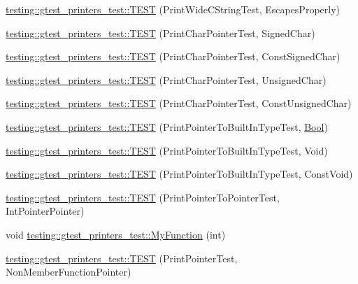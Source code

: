 \begin{DoxyCompactItemize}
\item 
\hyperlink{namespacetesting_1_1gtest__printers__test_aa80d6bb47e6bf997dacf0c75322d12cf}{testing\+::gtest\+\_\+printers\+\_\+test\+::\+T\+E\+ST} (Print\+Wide\+C\+String\+Test, Escapes\+Properly)
\item 
\hyperlink{namespacetesting_1_1gtest__printers__test_acd7a56709621a91dca669023d192bdc7}{testing\+::gtest\+\_\+printers\+\_\+test\+::\+T\+E\+ST} (Print\+Char\+Pointer\+Test, Signed\+Char)
\item 
\hyperlink{namespacetesting_1_1gtest__printers__test_ae854b0ca4d06ffc273c391f262884681}{testing\+::gtest\+\_\+printers\+\_\+test\+::\+T\+E\+ST} (Print\+Char\+Pointer\+Test, Const\+Signed\+Char)
\item 
\hyperlink{namespacetesting_1_1gtest__printers__test_afb9a6a26323b287b7666b6adb5bdb149}{testing\+::gtest\+\_\+printers\+\_\+test\+::\+T\+E\+ST} (Print\+Char\+Pointer\+Test, Unsigned\+Char)
\item 
\hyperlink{namespacetesting_1_1gtest__printers__test_aa0487f8fd5052f7d6afe2b18ad7931f9}{testing\+::gtest\+\_\+printers\+\_\+test\+::\+T\+E\+ST} (Print\+Char\+Pointer\+Test, Const\+Unsigned\+Char)
\item 
\hyperlink{namespacetesting_1_1gtest__printers__test_ad08dcd672b1e66a802a564eb974c400a}{testing\+::gtest\+\_\+printers\+\_\+test\+::\+T\+E\+ST} (Print\+Pointer\+To\+Built\+In\+Type\+Test, \hyperlink{struct_bool}{Bool})
\item 
\hyperlink{namespacetesting_1_1gtest__printers__test_ac6d8b84db9386b399eb431b5b1668e87}{testing\+::gtest\+\_\+printers\+\_\+test\+::\+T\+E\+ST} (Print\+Pointer\+To\+Built\+In\+Type\+Test, Void)
\item 
\hyperlink{namespacetesting_1_1gtest__printers__test_a8819fb42392faae72e8bc594d498085d}{testing\+::gtest\+\_\+printers\+\_\+test\+::\+T\+E\+ST} (Print\+Pointer\+To\+Built\+In\+Type\+Test, Const\+Void)
\item 
\hyperlink{namespacetesting_1_1gtest__printers__test_afee54807b15b623718c62008bd743d4b}{testing\+::gtest\+\_\+printers\+\_\+test\+::\+T\+E\+ST} (Print\+Pointer\+To\+Pointer\+Test, Int\+Pointer\+Pointer)
\item 
void \hyperlink{namespacetesting_1_1gtest__printers__test_adf0e590d6776ecb7095a989ff2272d7b}{testing\+::gtest\+\_\+printers\+\_\+test\+::\+My\+Function} (int)
\item 
\hyperlink{namespacetesting_1_1gtest__printers__test_aa3cb60cf6f3a4a0cd7d9873cd597ffd8}{testing\+::gtest\+\_\+printers\+\_\+test\+::\+T\+E\+ST} (Print\+Pointer\+Test, Non\+Member\+Function\+Pointer)

\end{DoxyCompactItemize}
